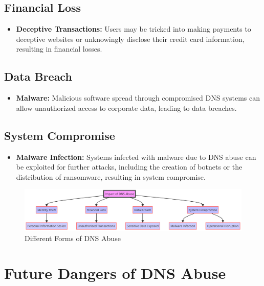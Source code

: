 \subsection{Financial Loss}
\begin{itemize}
    \item \textbf{Deceptive Transactions:} Users may be tricked into making payments to deceptive websites or unknowingly disclose their credit card information, resulting in financial losses.\cite{godaddy2023dnsabuse, bohme2013economics}
\end{itemize}

\subsection{Data Breach}
\begin{itemize}
    \item \textbf{Malware:} Malicious software spread through compromised DNS systems can allow unauthorized access to corporate data, leading to data breaches.\cite{icann2022dnsabusetrends, fowler2016data}
\end{itemize}

\subsection{System Compromise}
\begin{itemize}
    \item \textbf{Malware Infection:} Systems infected with malware due to DNS abuse can be exploited for further attacks, including the creation of botnets or the distribution of ransomware, resulting in system compromise.\cite{dotmagazine2022dnsabuse, saxe2018malware}
\end{itemize}

\begin{figure}[ht]
\centering
\includegraphics[width=1.0\textwidth]{background/DNSabuseHarm.png}
\caption{Different Forms of DNS Abuse}
\label{fig:figureFour}
\end{figure}


\section{Future Dangers of DNS Abuse}

